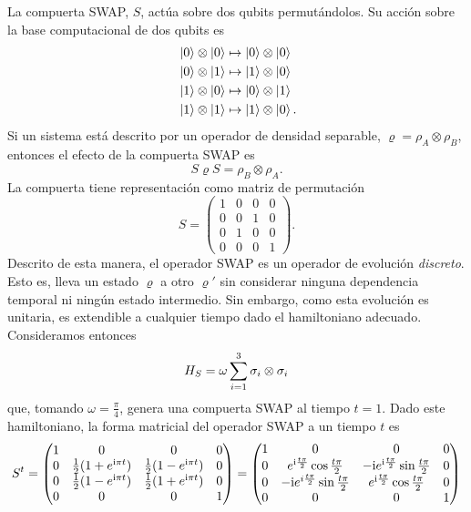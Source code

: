 La compuerta SWAP, $S$, actúa sobre dos qubits permutándolos. Su acción sobre la base computacional de dos qubits es
\begin{align}
    \ket{0}\otimes\ket{0}&\mapsto\ket{0}\otimes\ket{0}\nonumber\\
    \ket{0}\otimes\ket{1}&\mapsto\ket{1}\otimes\ket{0}\nonumber\\
    \ket{1}\otimes\ket{0}&\mapsto\ket{0}\otimes\ket{1}\nonumber\\
    \ket{1}\otimes\ket{1}&\mapsto\ket{1}\otimes\ket{0} \rlap{.}\nonumber
\end{align}
Si un sistema está descrito por un operador de densidad separable, $\varrho=\rho_{A}\otimes\rho_{B}$, entonces el efecto de la compuerta SWAP es 
\begin{equation}
    S\varrho S=\rho_{B}\otimes\rho_{A}.\nonumber
\end{equation}
La compuerta tiene representación como matriz de permutación
\begin{equation}
    S=\begin{pmatrix}
        1&0&0&0\\
        0&0&1&0\\
        0&1&0&0\\
        0&0&0&1
    \end{pmatrix}.\nonumber
\end{equation}
Descrito de esta manera, el operador SWAP es un operador de evolución \textit{discreto}. Esto es, lleva un estado $\varrho$ a otro $\varrho'$ sin considerar ninguna dependencia temporal ni ningún estado intermedio. Sin embargo, como esta evolución es unitaria, es extendible a cualquier tiempo dado el hamiltoniano adecuado. Consideramos entonces
\begin{equation}
  H_{S}=\omega\sum_{i=1}^{3}\sigma_{i}\otimes\sigma_{i}\nonumber
\end{equation}
que, tomando $\omega=\frac{\pi}{4}$, genera una compuerta SWAP al tiempo $t=1$. Dado este hamiltoniano, la forma matricial del operador \textsc{SWAP} a un tiempo $t$ es
\begin{equation}\label{eq:SWAP(t)}
S^{t}=\begin{pmatrix}
 1 & 0 & 0 & 0 \\
 0 & \frac{1}{2}(1+e^{\text{i} \pi t}) & \frac{1}{2} (1-e^{\text{i} \pi t}) & 0 \\
 0 & \frac{1}{2}(1-e^{\text{i} \pi t}) & \frac{1}{2}(1+e^{\text{i} \pi t}) & 0 \\
 0 & 0 & 0 & 1
\end{pmatrix}=\begin{pmatrix}
  1 & 0 & 0 & 0 \\
  0 & e^{\text{i}\frac{t\pi}{2}}\cos{\frac{t\pi}{2}} & -\text{i} e^{\text{i}\frac{t\pi}{2}}\sin{\frac{t\pi}{2}} & 0 \\
  0 & -\text{i} e^{i\frac{t\pi}{2}}\sin{\frac{t\pi}{2}} & e^{\text{i}\frac{t\pi}{2}}\cos{\frac{t\pi}{2}}  & 0 \\
  0 & 0 & 0 & 1
 \end{pmatrix}
\end{equation}

